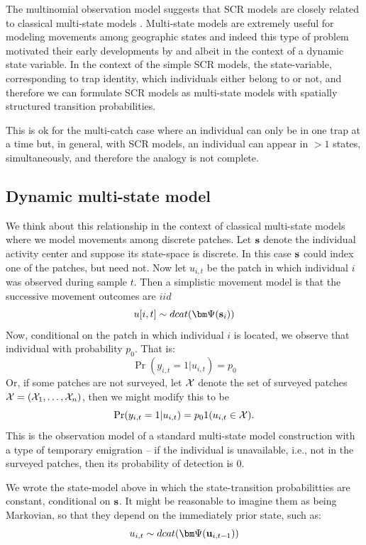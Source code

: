 The multinomial observation model 
suggests that SCR models are closely related to 
classical multi-state models \citep[][Chapt. 9]{kery_schaub:2011}.
Multi-state models are extremely useful for modeling movements among
geographic states and indeed this type of problem motivated their
early developments by \citet{arnason:1972,arnason:1973} and
\citet{hestbeck_etal:1991} albeit in the context of a dynamic state
variable.  In the context of the simple SCR models, the
state-variable, corresponding to trap identity, which individuals
either belong to or not, and therefore we can formulate SCR models as
multi-state models with spatially structured transition probabilities.

This is ok for the multi-catch case where an individual can only be in
one trap at a time but, in general, with SCR models, an individual can
appear in $>1$ states, simultaneously, and therefore the analogy is
not complete.

\subsection{Dynamic multi-state model}

We think about this relationship in the context of classical
multi-state models where we model movements among discrete patches.
Let ${\bf s}$ denote the individual activity
center and suppose its state-space is discrete. In this case ${\bf s}$
could index one of the patches, but need not.
Now let $u_{i,t}$ be
the patch in which individual $i$ was observed during sample $t$. Then
a simplistic movement model is that the successive movement outcomes
are $iid$
\[
u[i,t] \sim  dcat( {\bm \Psi}({\bf s}_{i}) )
\]
Now, conditional on the patch in which individual $i$ is located, we
observe that individual with probability $p_{0}$. That is:
\[
 \Pr(y_{i,t} = 1| u_{i,t} )  = p_{0}
\]
Or, if some patches are not surveyed, let ${\cal X}$ denote the set of
surveyed patches ${\cal X} = ({\cal X}_{1},\ldots,{\cal X}_{n})$, 
then we might modify this to be
\[
 \Pr(y_{i,t} = 1| u_{i,t} )  = p_{0}1(u_{i,t} \in {\cal X}).
\]
This is the observation model of a standard multi-state model construction with a type of
temporary emigration -- if the individual is unavailable, i.e., not in
the surveyed patches, then its probability of detection is 0. 

We wrote the state-model above in which the state-transition
probabilitties are constant, conditional on ${\bf s}$. 
It might be reasonable to imagine them as being Markovian, so that
they depend on the immediately prior state, such as:
\[
u_{i,t} \sim  dcat( {\bm \Psi}({\bf u}_{i,t-1}) )
\]

